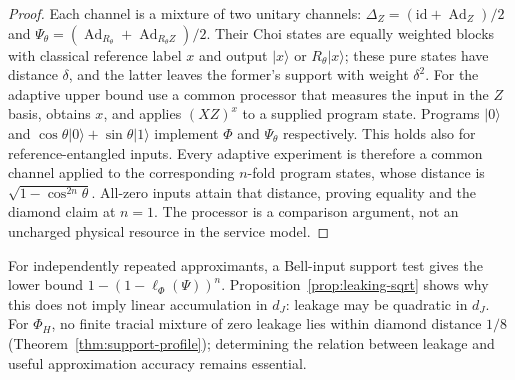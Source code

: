 \documentclass[11pt,a4paper]{article}
\theoremstyle{plain}
\theoremstyle{definition}
\theoremstyle{remark}
\DeclareMathOperator{\Ad}{Ad}
\newcommand{\dJ}{d_J}
\begin{document}
\begin{proof}
Each channel is a mixture of two unitary channels: $\Delta_Z=(\mathrm{id}+\Ad_Z)/2$ and
$\Psi_\theta=(\Ad_{R_\theta}+\Ad_{R_\theta Z})/2$. Their Choi states are equally weighted blocks with classical reference label $x$ and
output $|x\rangle$ or $R_\theta|x\rangle$; these pure states have distance $\delta$, and the latter leaves the former's support with weight
$\delta^2$. For the adaptive upper bound use a common processor that measures the input in the $Z$ basis, obtains $x$, and applies $(XZ)^x$
to a supplied program state. Programs $|0\rangle$ and $\cos\theta|0\rangle+\sin\theta|1\rangle$ implement $\Phi$ and $\Psi_\theta$ respectively.
This holds also for reference-entangled inputs. Every adaptive experiment is therefore a common channel applied to the corresponding $n$-fold
program states, whose distance is $\sqrt{1-\cos^{2n}\theta}$. All-zero inputs attain that distance, proving equality and the diamond claim at $n=1$.
The processor is a comparison argument, not an uncharged physical resource in the service model.
\end{proof}

For independently repeated approximants, a Bell-input support test gives the lower bound
$1-(1-\ell_\Phi(\Psi))^n$. Proposition~\ref{prop:leaking-sqrt} shows why this does not imply linear accumulation in $\dJ$:
leakage may be quadratic in $\dJ$. For $\Phi_H$, no finite tracial mixture of zero leakage lies within diamond distance $1/8$
(Theorem~\ref{thm:support-profile}); determining the relation between leakage and useful approximation accuracy remains essential.
\end{document}
